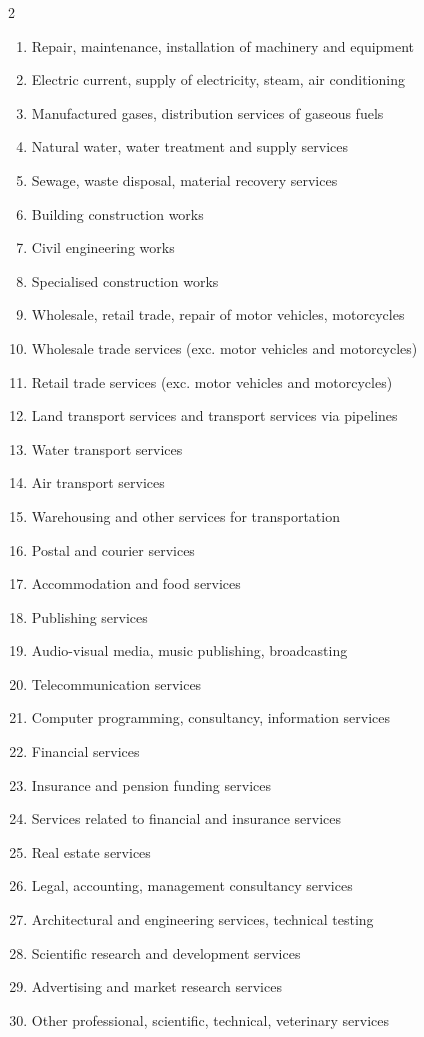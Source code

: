 \begin{multicols}{2}
\begin{enumerate}[leftmargin=*,itemsep=0pt,parsep=0pt]
\item Repair, maintenance, installation of machinery and equipment
\item Electric current, supply of electricity, steam, air conditioning
\item Manufactured gases, distribution services of gaseous fuels
\item Natural water, water treatment and supply services
\item Sewage, waste disposal, material recovery services
\item Building construction works
\item Civil engineering works
\item Specialised construction works
\item Wholesale, retail trade, repair of motor vehicles, motorcycles
\item Wholesale trade services (exc. motor vehicles and motorcycles)
\item Retail trade services (exc. motor vehicles and motorcycles)
\item Land transport services and transport services via pipelines
\item Water transport services
\item Air transport services
\item Warehousing and other services for transportation
\item Postal and courier services
\item Accommodation and food services
\item Publishing services
\item Audio-visual media, music publishing, broadcasting
\item Telecommunication services
\item Computer programming, consultancy, information services
\item Financial services
\item Insurance and pension funding services
\item Services related to financial and insurance services
\item Real estate services
\item Legal, accounting, management consultancy services
\item Architectural and engineering services, technical testing
\item Scientific research and development services
\item Advertising and market research services
\item Other professional, scientific, technical, veterinary services

\end{enumerate}
\end{multicols}
